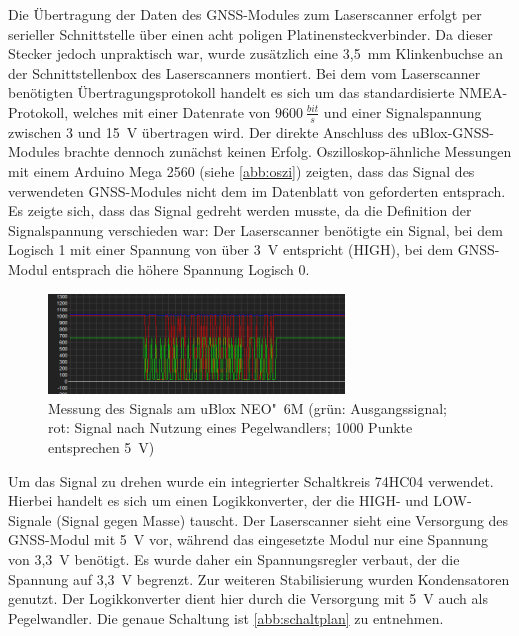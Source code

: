 \documentclass[a4paper,12pt,bibliography=totoc, listof=totoc,titlepage,pointlessnumbers]{scrreprt}
\begin{document}
Die Übertragung der Daten des GNSS-Modules zum Laser\-scan\-ner erfolgt per serieller Schnittstelle über einen acht poligen Platinensteckverbinder. Da dieser Stecker jedoch unpraktisch war, wurde zu\-sätz\-lich eine 3,5~mm Klinkenbuchse an der Schnittstellenbox des Laser\-scan\-ners montiert. Bei dem vom Laser\-scan\-ner benötigten Übertragungsprotokoll handelt es sich um das standardisierte NMEA-Protokoll, welches mit einer Datenrate von \(9600~\frac{bit}{s}\) und einer Signalspannung zwischen 3 und 15~V übertragen wird. Der direkte Anschluss des uBlox-GNSS-Modules brachte dennoch zunächst keinen Erfolg. Oszilloskop-ähnliche Messungen mit einem Arduino Mega 2560 (siehe \autoref{abb:oszi}) zeigten, dass das Signal des verwendeten GNSS-Modules nicht dem im Datenblatt von \citet[S. 3]{vlpInterface} geforderten entsprach. Es zeigte sich, dass das Signal gedreht werden musste, da die Definition der Signalspannung verschieden war: Der Laser\-scan\-ner benötigte ein Signal, bei dem Logisch 1 mit einer Spannung von über 3~V \citep[S. 3]{vlpInterface} entspricht (HIGH), bei dem GNSS-Modul entsprach die höhere Spannung Logisch 0.

\begin{figure}
 \centering
 \includegraphics[width=0.7\textwidth]{img/oszi.png}
 \caption{Messung des Signals am uBlox NEO"~6M (grün: Ausgangssignal; rot: Signal nach Nutzung eines Pegelwandlers; 1000 Punkte entsprechen 5~V)}
 \label{abb:oszi}
\end{figure}

Um das Signal zu drehen wurde ein integrierter Schaltkreis 74HC04 verwendet. Hierbei handelt es sich um einen Logikkonverter, der die HIGH- und LOW-Signale (Signal gegen Masse) tauscht. Der Laser\-scan\-ner sieht eine Versorgung des GNSS-Modul mit 5~V vor, während das eingesetzte Modul nur eine Spannung von 3,3~V benötigt. Es wurde daher ein Spannungsregler verbaut, der die Spannung auf 3,3~V begrenzt. Zur weiteren Stabilisierung wurden Kondensatoren genutzt. Der Logikkonverter dient hier durch die Versorgung mit 5~V auch als Pegelwandler. Die genaue Schaltung ist \autoref{abb:schaltplan} zu entnehmen.
\end{document}
